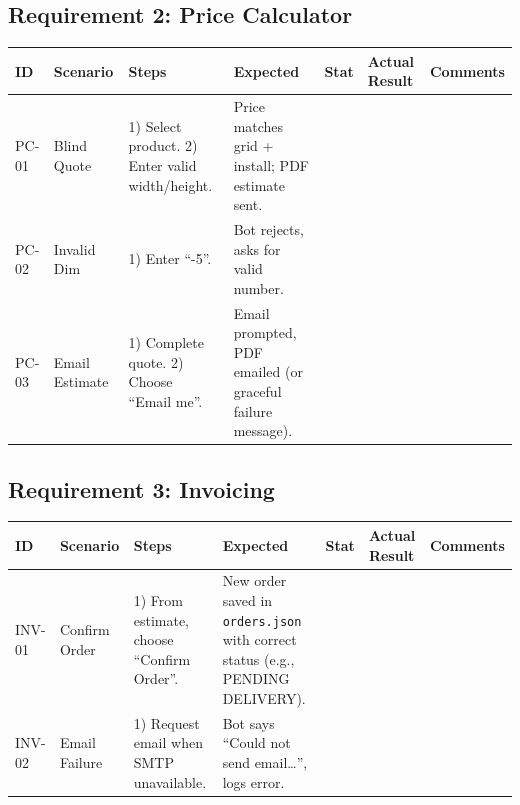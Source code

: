 ﻿\documentclass[11pt, a4paper]{article}
\begin{document}
\subsection{Requirement 2: Price Calculator}
\begin{longtable}{|p{}|p{}|p{}|p{}|p{}|p{}|p{}|}
    \hline
    \rowcolor{headergray} \textbf{ID} & \textbf{Scenario} & \textbf{Steps} & \textbf{Expected} & \textbf{Stat} & \textbf{Actual Result} & \textbf{Comments} \\ \hline
    \endhead

    PC-01 & Blind Quote & 1) Select product. 2) Enter valid width/height. & Price matches grid + install; PDF estimate sent. & & & \\ \hline

    PC-02 & Invalid Dim & 1) Enter “-5”. & Bot rejects, asks for valid number. & & & \\ \hline

    PC-03 & Email Estimate & 1) Complete quote. 2) Choose “Email me”. & Email prompted, PDF emailed (or graceful failure message). & & & \\ \hline
\end{longtable}

\subsection{Requirement 3: Invoicing}
\begin{longtable}{|p{}|p{}|p{}|p{}|p{}|p{}|p{}|}
    \hline
    \rowcolor{headergray} \textbf{ID} & \textbf{Scenario} & \textbf{Steps} & \textbf{Expected} & \textbf{Stat} & \textbf{Actual Result} & \textbf{Comments} \\ \hline
    \endhead

    INV-01 & Confirm Order & 1) From estimate, choose “Confirm Order”. & New order saved in \texttt{orders.json} with correct status (e.g., PENDING DELIVERY). & & & \\ \hline

    INV-02 & Email Failure & 1) Request email when SMTP unavailable. & Bot says “Could not send email…”, logs error. & & & \\ \hline
\end{longtable}
\end{document}
